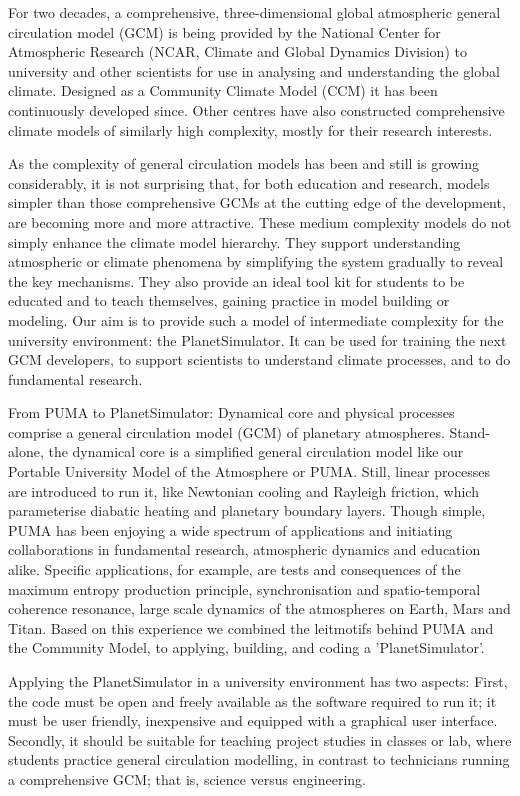 For two decades, a comprehensive, three-dimensional global atmospheric
 general circulation model (GCM) is being provided by the National
 Center for Atmospheric Research (NCAR, Climate and Global Dynamics Division)
 to university and other scientists for use in analysing and understanding
 the global climate. Designed as a Community Climate Model (CCM)
 it has been continuously developed since. Other centres have also
 constructed comprehensive climate models of similarly high complexity,
 mostly for their research interests.

As the complexity of general circulation models has been and still
 is growing considerably, it is not surprising that, for both
 education and research, models simpler than those comprehensive
 GCMs at the cutting edge of the development, are becoming more
 and more attractive. These medium complexity models do not simply
 enhance the climate model hierarchy. They support understanding
 atmospheric or climate phenomena by simplifying the system
 gradually to reveal the key mechanisms. They also provide an
 ideal tool kit for students to be educated and to teach themselves,
 gaining practice in model building or modeling. Our aim is to
 provide such a model of intermediate complexity for the university
 environment: the PlanetSimulator. It can be used for training
 the next GCM developers, to support scientists to understand
 climate processes, and to do fundamental research.

From PUMA to PlanetSimulator: Dynamical core and physical processes
 comprise a general circulation model (GCM) of planetary atmospheres.
 Stand-alone, the dynamical core is a simplified general circulation
 model like our Portable University Model of the Atmosphere or PUMA.
 Still, linear processes are introduced to run it, like Newtonian
 cooling and Rayleigh friction, which parameterise diabatic heating
 and planetary boundary layers. Though simple, PUMA has been enjoying
 a wide spectrum of applications and initiating collaborations in
 fundamental research, atmospheric dynamics and education alike.
 Specific applications, for example, are tests and consequences
 of the maximum entropy production principle, synchronisation and
 spatio-temporal coherence resonance, large scale dynamics of the
 atmospheres on Earth, Mars and Titan. Based on this experience we
 combined the leitmotifs behind PUMA and the Community Model, to
 applying, building, and coding a 'PlanetSimulator'.

Applying the PlanetSimulator in a university environment has two
 aspects: First, the code must be open and freely available as
 the software required to run it; it must be user friendly,
 inexpensive and equipped with a graphical user interface.
 Secondly, it should be suitable for teaching project studies
 in classes or lab, where students practice general circulation
 modelling, in contrast to technicians running a comprehensive GCM;
 that is, science versus engineering.


